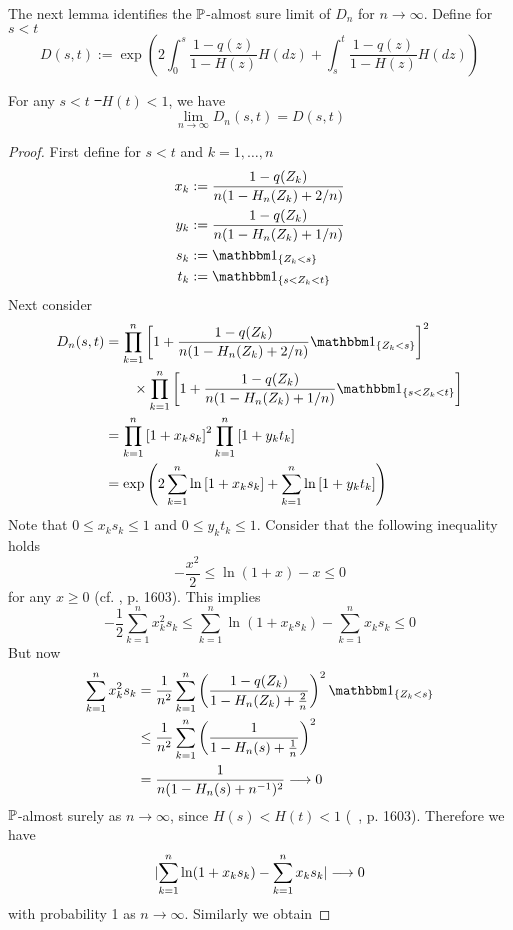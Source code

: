 %
The next lemma identifies the $\P$-almost sure limit of $D_n$ for $n\to\infty$. Define for $s<t$
$$D(s,t) := \exp\left(2\int_{0}^{s} \frac{1-q(z)}{1-H(z)} H(dz) + \int_{s}^{t} \frac{1-q(z)}{1-H(z)} H(dz)\right)$$
\begin{lemma} \label{lem:dn_limit}
	For any $s < t$ \st\ $H(t)<1$, we have
	$$\lim\limits_{n\to\infty}D_n(s,t) = D(s,t)$$
	\begin{proof}
		First define for $s<t$ and $k=1,\dots,n$
		\begin{align*}
		x_k &:= \frac{1-q(Z_k)}{n(1- H_n(Z_k) + 2/n)}\\
		y_k &:= \frac{1-q(Z_k)}{n(1- H_n(Z_k) + 1/n)}\\
		s_k &:= \I{Z_k < s} \\
		t_k &:= \I{s < Z_k < t}
		\end{align*}
		Next consider 
		\begin{align*}
		D_n(s,t) &= \prod_{k=1}^{n} \left[1+\frac{1-q(Z_k)}{n(1- H_n(Z_k) + 2/n)}\I{Z_k<s}\right]^{2}\\ 
		&\qquad \times \prod_{k=1}^{n}\left[1+\frac{1-q(Z_k)}{n(1-H_n(Z_k)+1/n)}\I{s < Z_k < t}\right]\\
		&= \prod_{k=1}^{n} \left[1+x_k s_k\right]^{2} \prod_{k=1}^{n}\left[1+y_k t_k\right]\\
		&= \exp\left(2\sum_{k=1}^{n}\ln\left[1+x_k s_k\right] + \sum_{k=1}^{n}\ln\left[1+y_k t_k\right]\right)\\
		\end{align*}
		Note that $0 \leq x_k s_k \leq 1$ and $0 \leq y_k t_k \leq 1$. Consider that the following inequality holds  
		$$-\frac{x^2}{2} \leq \ln(1+x) - x \leq 0$$ 
		for any $x \geq 0$ (cf.  \cite{stute1993strong}, p. 1603). This implies 
		$$-\frac{1}{2}\sum_{k=1}^{n}x_k^2 s_k \leq \sum_{k=1}^{n}\ln(1+x_k s_k) - \sum_{k=1}^{n}x_k s_k \leq 0$$ 
		But now 
		\begin{align*}
		\sum_{k=1}^{n} x_k^2 s_k &= \frac{1}{n^2} \sum_{k=1}^{n} \left(\frac{1-q(Z_k)}{1-H_n(Z_k)+\frac{2}{n}}\right)^2\I{Z_k<s}\\
		&\leq \frac{1}{n^2} \sum_{k=1}^{n} \left(\frac{1}{1-H_n(s)+\frac{1}{n}}\right)^2\\
		&= \frac{1}{n(1-H_n(s)+n^{-1})^2} \longrightarrow 0
		\end{align*}
		$\P$-almost surely as $n\to\infty$, since $H(s)<H(t)<1$ (\cf\ \cite{stute1993strong}, p. 1603). Therefore we have
		$$\abs{\sum_{k=1}^{n}\ln(1+x_k s_k) - \sum_{k=1}^{n}x_k s_k} \longrightarrow 0$$
		with probability 1 as $n\to\infty$. 
		Similarly we obtain

\end{proof}
\end{lemma}
